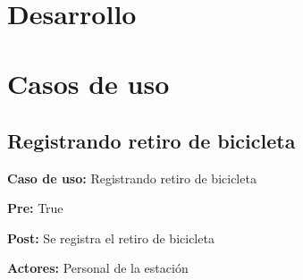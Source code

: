 \documentclass[a4paper, 10pt, twoside]{article}
\begin{document}
\begin{usecase}
\end{usecase}
\begin{usecasesteps}
         { \\
          }
         {}
\end{usecasesteps}


\vspace{2cm}






\section{Desarrollo}




\section{Casos de uso}

\subsection{Registrando retiro de bicicleta}

\textbf{Caso de uso:} Registrando retiro de bicicleta

\textbf{Pre:} True

\textbf{Post:} Se registra el retiro de bicicleta

\textbf{Actores:} Personal de la estación
\\
\end{document}
